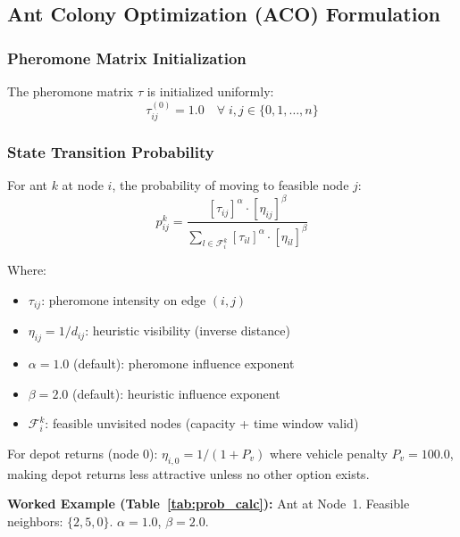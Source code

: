 \documentclass[10pt,conference]{IEEEtran}
\begin{document}
\subsection{Ant Colony Optimization (ACO) Formulation}

\subsubsection{Pheromone Matrix Initialization}
The pheromone matrix $\tau$ is initialized uniformly:
\begin{equation}
    \tau_{ij}^{(0)} = 1.0 \quad \forall \; i, j \in \{0, 1, \ldots, n\}
\end{equation}

\subsubsection{State Transition Probability}
For ant $k$ at node $i$, the probability of moving to feasible node $j$:
\begin{equation}
    p_{ij}^k = \frac{[\tau_{ij}]^{\alpha} \cdot [\eta_{ij}]^{\beta}}{\sum_{l \in \mathcal{F}_i^k} [\tau_{il}]^{\alpha} \cdot [\eta_{il}]^{\beta}}
    \label{eq:transition}
\end{equation}

Where:
\begin{itemize}
    \item $\tau_{ij}$: pheromone intensity on edge $(i,j)$
    \item $\eta_{ij} = 1 / d_{ij}$: heuristic visibility (inverse distance)
    \item $\alpha = 1.0$ (default): pheromone influence exponent
    \item $\beta = 2.0$ (default): heuristic influence exponent
    \item $\mathcal{F}_i^k$: feasible unvisited nodes (capacity + time window valid)
\end{itemize}

For depot returns (node 0): $\eta_{i,0} = 1 / (1 + P_v)$ where vehicle penalty $P_v = 100.0$, making depot returns less attractive unless no other option exists.

\textbf{Worked Example (Table~\ref{tab:prob_calc}):} Ant at Node~1. Feasible neighbors: $\{2, 5, 0\}$. $\alpha = 1.0$, $\beta = 2.0$.
\end{document}
